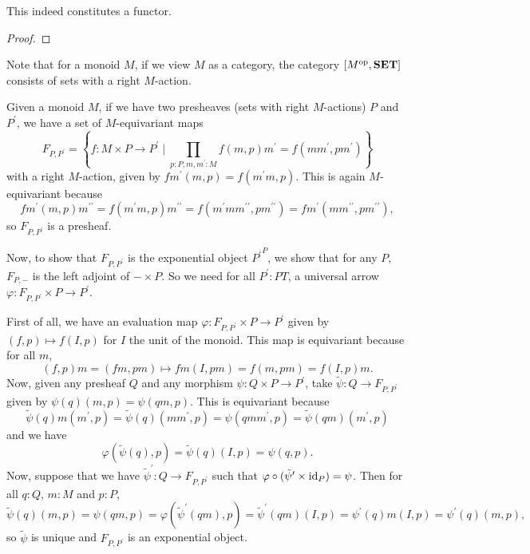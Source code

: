 \begin{lemma}
  This indeed constitutes a functor.
\end{lemma}
\begin{proof}
  \TODO
\end{proof}

\begin{remark}
  Note that for a monoid $ M $, if we view $ M $ as a category, the category $ [M^{\text{op}}, \mathbf{SET}] $ consists of sets with a right $ M $-action.
\end{remark}

\begin{definition}
  Given a monoid $ M $, if we have two presheaves (sets with right $ M $-actions) $ P $ and $ P^\prime $, we have a set of $ M $-equivariant maps
  \[ F_{P, P^\prime} = \left\{ f: M \times P \to P^\prime \mid \prod_{p : P, m, m^\prime: M} f(m, p)m^\prime = f(m m^\prime, p m^\prime) \right\} \]
  with a right $ M $-action, given by $ f m^\prime(m, p) = f(m^\prime m, p) $. This is again $ M $-equivariant because
  \[ fm^\prime(m, p)m^{\prime \prime} = f(m^\prime m, p)m^{\prime \prime} = f(m^\prime m m^{\prime \prime}, p m^{\prime \prime}) = f m^\prime(m m^{\prime \prime}, p m^{\prime \prime}), \]
  so $ F_{P, P^\prime} $ is a presheaf.

  Now, to show that $ F_{P, P^\prime} $ is the exponential object $ {P^\prime}^P $, we show that for any $ P $, $ F_{P, -} $ is the left adjoint of $ - \times P $. So we need for all $ P^\prime: PT $, a universal arrow $ \varphi: F_{P, P^\prime} \times P \to P^\prime $.

  First of all, we have an evaluation map $ \varphi: F_{P, P^\prime} \times P \to P^\prime $ given by $ (f, p) \mapsto f(I, p) $ for $ I $ the unit of the monoid. This map is equivariant because for all $ m $,
  \[ (f, p) m = (f m, p m) \mapsto f m(I, p m) = f(m, p m) = f(I, p) m. \]
  Now, given any presheaf $ Q $ and any morphism $ \psi: Q \times P \to P^\prime $, take $ \tilde \psi: Q \to F_{P, P^\prime} $ given by $ \psi(q)(m, p) = \psi(q m, p) $. This is equivariant because
  \[ \tilde \psi(q)m(m^\prime, p) = \tilde \psi(q)(m m^\prime, p) = \psi(q m m^\prime, p) = \tilde \psi(q m)(m^\prime, p) \]
  and we have
  \[ \varphi(\tilde \psi(q), p) = \tilde \psi(q)(I, p) = \psi(q, p). \]
  Now, suppose that we have $ \tilde \psi^\prime: Q \to F_{P, P^\prime} $ such that $ \varphi \circ (\tilde \psi^\prime \times \text{id}_{P}) = \psi $. Then for all $ q : Q $, $ m: M $ and $ p: P $,
  \[ \tilde \psi(q)(m, p) = \psi(q m, p) = \varphi(\tilde \psi^\prime(q m), p) = \tilde \psi^\prime(q m)(I, p) = \psi^\prime(q) m(I, p) = \psi^\prime(q)(m, p), \]
  so $ \tilde \psi $ is unique and $ F_{P, P^\prime} $ is an exponential object.
\end{definition}

